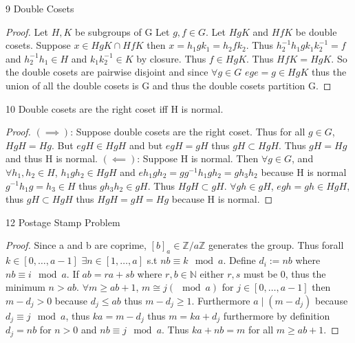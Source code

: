 \documentclass{article}
\newcommand{\Z}{\mathbb{Z}}
\newcommand{\N}{\mathbb{N}}
\begin{document}
\begin{PROB}{9}\label{Problem 9.}
    Double Cosets
\end{PROB}
\begin{proof}
    Let $H, K$ be subgroups of G
    Let $g, f \in G$. Let $HgK$ and $HfK$ be double cosets. Suppose $x \in HgK \cap HfK$ then $x = h_1gk_1 = h_2fk_2$. Thus $h_2^{-1}h_1gk_1k_2^{-1} = f$ and $h_2^{-1}h_1 \in H$ and $k_1k_2^{-1} \in K$ by closure. Thus $f \in HgK$. Thus $HfK = HgK$. So the double cosets are pairwise disjoint and since $\forall g \in G$ $ege = g \in HgK$ thus the union of all the double cosets is G and thus the double cosets partition G.
\end{proof}

\bigskip
\begin{PROB}{10}\label{Problem 10.}
    Double cosets are the right coset iff H is normal.
\end{PROB}
\begin{proof}
    $(\implies)$: Suppose double cosets are the right coset. Thus for all $g \in G$, $HgH = Hg$. But $egH \in HgH$ and but $egH = gH$ thus $gH \subset HgH$. Thus $gH = Hg$ and thus H is normal.
    $(\impliedby)$: Suppose H is normal. Then $\forall g \in G$, and $\forall h_1, h_2 \in H$, $h_1gh_2 \in HgH$ and $eh_1gh_2 = gg^{-1}h_1gh_2 = gh_3h_2$ because H is normal $g^{-1}h_1g = h_3 \in H$ thus $gh_3h_2 \in gH$. Thus $HgH \subset gH$. $\forall gh \in gH$, $egh = gh \in HgH$, thus $gH \subset HgH$ thus $HgH = gH = Hg$ because H is normal.
\end{proof}

\bigskip

\begin{PROB}{12}\label{Problem 12.}
    Postage Stamp Problem
\end{PROB}
\begin{proof}
    Since a and b are coprime, $[b]_a \in \Z/a\Z$ generates the group. Thus forall $k \in [0, \ldots, a - 1]$  $\exists n \in [1, \ldots, a]$ s.t $nb \equiv k \mod a$. Define $d_i := nb$ where $nb \equiv i \mod a$. If $ab = ra + sb$ where $r, b \in \N$ either $r, s$ must be 0, thus the minimum $n > ab$. $\forall m \geq ab + 1$, $m \cong j (\mod a)$ for $j \in [0, \ldots, a-1]$ then $m - d_j > 0$ because $d_j \leq ab$ thus $m - d_j \geq 1$. Furthermore $a \mid (m - d_j)$ because $d_j \equiv j \mod a$, thus $ka = m -d_j$ thus $m = ka + d_j$ furthermore by definition $d_j = nb$ for $n>0$ and $nb \equiv j \mod a$. Thus $ka + nb = m$ for all $m \geq ab + 1$.
\end{proof}
\end{document}
